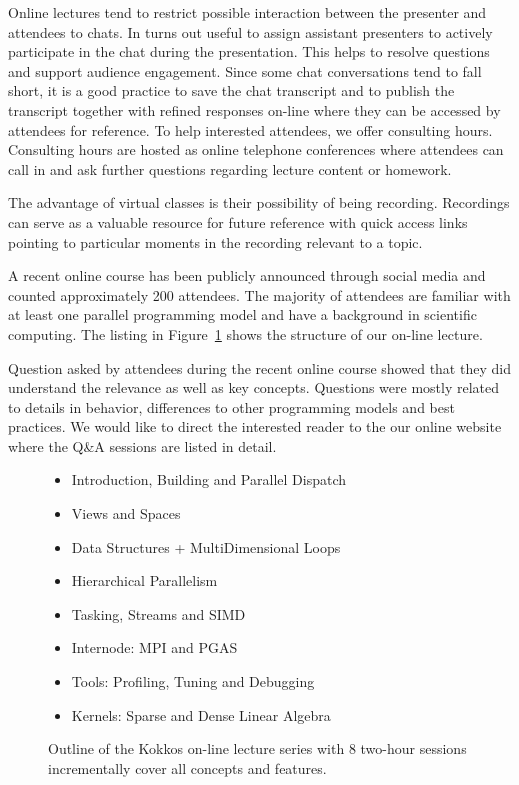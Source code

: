 Online lectures tend to restrict possible interaction between the presenter and attendees to chats. In turns out useful to assign assistant presenters to actively participate in the chat during the presentation. This helps to resolve questions and support audience engagement. Since some chat conversations tend to fall short, it is a good practice to save the chat transcript and to publish the transcript together with refined responses on-line where they can be accessed by attendees for reference. To help interested attendees, we offer consulting hours. Consulting hours are hosted as online telephone conferences where attendees can call in and ask further questions regarding lecture content or homework.

The advantage of virtual classes is their possibility of being recording. Recordings can serve as a valuable resource for future reference with quick access links pointing to particular moments in the recording relevant to a topic. 

A recent online course\cite{KOKKOS_LECTURE} has been publicly announced through social media and counted approximately 200 attendees. The majority of attendees are familiar with at least one parallel programming model and have a background in scientific computing. The listing in Figure~\ref{fig:lectureOutline} shows the structure of our on-line lecture.

Question asked by attendees during the recent online course showed that they did understand the relevance as well as key concepts. Questions were mostly related to details in behavior, differences to other programming models and best practices. We would like to direct the interested reader to the our online website where the Q\&A sessions are listed in detail.

\begin{figure}

\begin{itemize}
\item Introduction, Building and Parallel Dispatch
\item Views and Spaces
\item Data Structures + MultiDimensional Loops
\item Hierarchical Parallelism
\item Tasking, Streams and SIMD
\item Internode: MPI and PGAS
\item Tools: Profiling, Tuning and Debugging
\item Kernels: Sparse and Dense Linear Algebra
\end{itemize}
\caption{Outline of the Kokkos on-line lecture series with 8 two-hour sessions incrementally cover all concepts and features.}
\label{fig:lectureOutline}
\end{figure}




